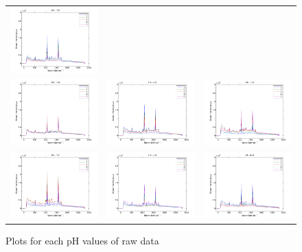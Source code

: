 \documentclass[a4paper]{article}
\begin{document}
\begin{figure}[h]
\begin{tabular}{ccc}
\includegraphics[width=.33\textwidth]{images/6.pdf}  \\
\includegraphics[width=.33\textwidth]{images/7.pdf}  & 
\includegraphics[width=.33\textwidth]{images/8.pdf}  &
\includegraphics[width=.33\textwidth]{images/9.pdf}  \\ 
\includegraphics[width=.33\textwidth]{images/10.pdf} &
\includegraphics[width=.33\textwidth]{images/11.pdf} & 
\includegraphics[width=.33\textwidth]{images/12.pdf} \\
\end{tabular}
\caption{Plots for each pH values of raw data}\label{pic2}
\end{figure}
\end{document}
